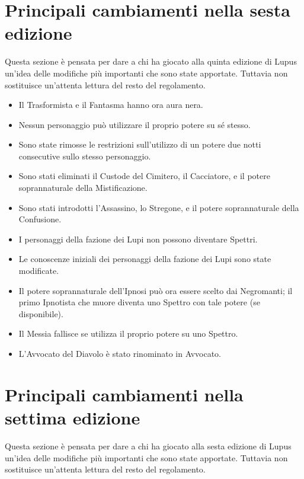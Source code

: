 \documentclass[a4paper,10pt]{article}
\begin{document}
\section{Principali cambiamenti nella sesta edizione}
 
Questa sezione è pensata per dare a chi ha giocato alla quinta edizione di Lupus un'idea delle modifiche più importanti che sono state apportate. Tuttavia non sostituisce un'attenta lettura del resto del regolamento.

\begin{itemize}
	\item Il Trasformista e il Fantasma hanno ora aura nera.
	\item Nessun personaggio può utilizzare il proprio potere su sé stesso.
	\item Sono state rimosse le restrizioni sull'utilizzo di un potere due notti consecutive sullo stesso personaggio.
	\item Sono stati eliminati il Custode del Cimitero, il Cacciatore, e il potere soprannaturale della Mistificazione.
	\item Sono stati introdotti l'Assassino, lo Stregone, e il potere soprannaturale della Confusione.
	\item I personaggi della fazione dei Lupi non possono diventare Spettri.
	\item Le conoscenze iniziali dei personaggi della fazione dei Lupi sono state modificate.
	\item Il potere soprannaturale dell'Ipnosi può ora essere scelto dai Negromanti; il primo Ipnotista che muore diventa uno Spettro con tale potere (se disponibile).
	\item Il Messia fallisce se utilizza il proprio potere su uno Spettro.
	\item L'Avvocato del Diavolo è stato rinominato in Avvocato.
\end{itemize}

\section{Principali cambiamenti nella settima edizione}
 
Questa sezione è pensata per dare a chi ha giocato alla sesta edizione di Lupus un'idea delle modifiche più importanti che sono state apportate. Tuttavia non sostituisce un'attenta lettura del resto del regolamento.
 
\end{document}
